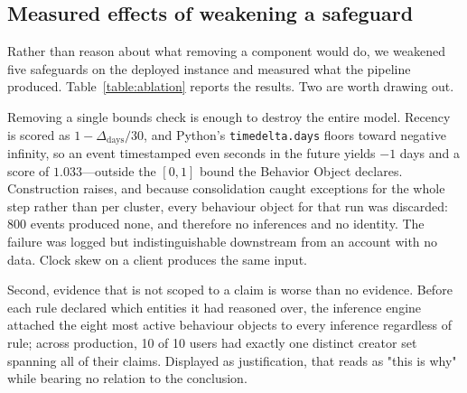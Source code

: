 \documentclass[conference]{IEEEtran}
\begin{document}
\subsection{Measured effects of weakening a safeguard}
Rather than reason about what removing a component would do, we weakened five safeguards on the deployed instance and measured what the pipeline produced. Table~\ref{table:ablation} reports the results. Two are worth drawing out.

Removing a single bounds check is enough to destroy the entire model. Recency is scored as $1 - \Delta_{\text{days}}/30$, and Python's \texttt{timedelta.days} floors toward negative infinity, so an event timestamped even seconds in the future yields $-1$ days and a score of $1.033$---outside the $[0,1]$ bound the Behavior Object declares. Construction raises, and because consolidation caught exceptions for the whole step rather than per cluster, every behaviour object for that run was discarded: 800 events produced none, and therefore no inferences and no identity. The failure was logged but indistinguishable downstream from an account with no data. Clock skew on a client produces the same input.

Second, evidence that is not scoped to a claim is worse than no evidence. Before each rule declared which entities it had reasoned over, the inference engine attached the eight most active behaviour objects to every inference regardless of rule; across production, 10 of 10 users had exactly one distinct creator set spanning all of their claims. Displayed as justification, that reads as "this is why" while bearing no relation to the conclusion.

\begin{table}[htbp]
\centering
\caption{Measured effect of weakening each safeguard, on a deployed instance. Corpus: 195 behaviour objects and 6{,}451 captioned events across 10 accounts, of which most are synthetically seeded.}
\label{table:ablation}
\footnotesize
{}
\end{table}
\end{document}
